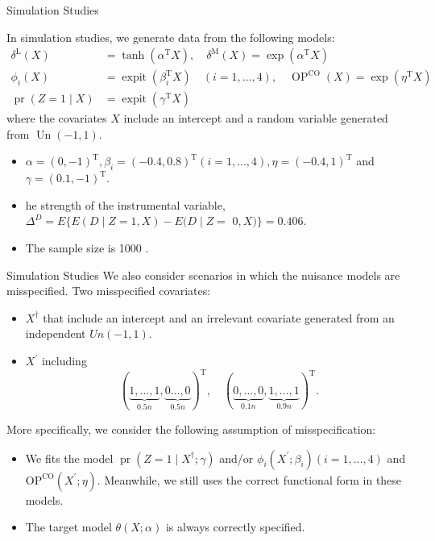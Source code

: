 \documentclass[aspectratio=169,xcolor=dvipsnames]{beamer}
\begin{document}
\begin{frame}{Simulation Studies}

In simulation studies, we generate data from the following models:
$$
\begin{aligned}
\delta^{\mathrm{L}}(X) &=\tanh \left(\alpha^{\mathrm{T}} X\right), \quad \delta^{\mathrm{M}}(X)=\exp \left(\alpha^{\mathrm{T}} X\right) \\
\phi_{i}(X) &=\operatorname{expit}\left(\beta_{i}^{\mathrm{T}} X\right) \quad(i=1, \ldots, 4), \quad \operatorname{OP}^{\mathrm{CO}}(X)=\exp \left(\eta^{\mathrm{T}} X\right) \\
\operatorname{pr}(Z=1 \mid X) &=\operatorname{expit}\left(\gamma^{\mathrm{T}} X\right)
\end{aligned}
$$
where the covariates $X$ include an intercept and a random variable generated from $\operatorname{Un}(-1,1)$.
\begin{itemize}
\item $\alpha=(0,-1)^{\mathrm{T}}, \beta_{i}=(-0.4,0.8)^{\mathrm{T}}(i=1, \ldots, 4), \eta=(-0.4,1)^{\mathrm{T}}$ and $\gamma=(0.1,-1)^{\mathrm{T}}$. \item he strength of the instrumental variable, $\Delta^{D}=E\{E(D \mid Z=1, X)-E(D \mid Z=$ $0, X)\}=0.406$. 
\item The sample size is 1000 .
\end{itemize}
\end{frame}

\begin{frame}{Simulation Studies}
We also consider scenarios in which the nuisance models are misspecified. Two misspecified covariates:
\begin{itemize}
\item $X^{\dagger}$ that include an intercept and an irrelevant covariate generated from an independent $U n(-1,1)$.
\item $X^{\prime}$ including
$$
(\underbrace{1, \ldots, 1}_{0.5 n}, \underbrace{0 \ldots, 0}_{0.5 n})^{\mathrm{T}}, \quad(\underbrace{0, \ldots, 0}_{0.1 n}, \underbrace{1, \ldots, 1}_{0.9 n})^{\mathrm{T}} .
$$
\end{itemize}

More specifically, we consider the following assumption of misspecification:
\begin{itemize}
\item We fits the model $\operatorname{pr}\left(Z=1 \mid X^{\dagger} ; \gamma\right)$ and/or $\phi_{i}\left(X^{\prime} ; \beta_{i}\right)(i=1, \ldots, 4)$ and $\mathrm{OP}^{\mathrm{CO}}\left(X^{\prime} ; \eta\right)$. Meanwhile, we still uses the correct functional form in these models. 
\item The target model $\theta(X ; \alpha)$ is always correctly specified.
\end{itemize}
\end{frame}
\end{document}
